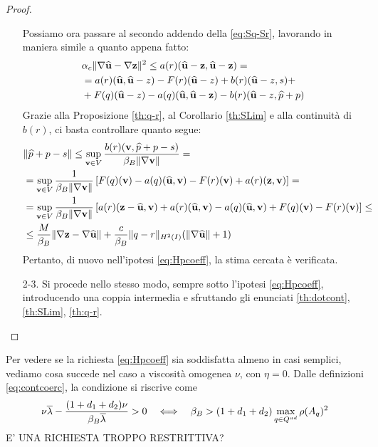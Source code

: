 \begin{proof}
\begin{enumerate}
	Possiamo ora passare al secondo addendo della \eqref{eq:Sq-Sr}, lavorando in maniera simile a quanto appena fatto:
	\begin{equation*}\begin{split}
	&\alpha_c\|\nabla\widehat{\u}-\nabla\z\|^2\leq a(r)(\widehat{\u}-\z,\widehat{\u}-\z)=\\
	&=a(r)(\widehat{\u},\widehat{\u}-z)-F(r)(\widehat{\u}-z)+b(r)(\widehat{\u}-z,s)+\\
	&+F(q)(\widehat{\u}-z)-a(q)(\widehat{\u},\widehat{\u}-\z)-b(r)(\widehat{\u}-z,\widehat{p}+p)%
	\end{split}\end{equation*}
	Grazie alla Proposizione \ref{th:q-r}, al Corollario \ref{th:SLim} e alla continuità di $b(r)$, ci basta controllare quanto segue:
	\begin{equation*}\begin{split}
	&\|\widehat{p}+p-s\|\leq \sup_{\mathbf{v}\in V}\frac{b(r)(\mathbf{v},\widehat{p}+p-s)}{\beta_B\|\nabla\mathbf{v}\|} =\\
	&=\sup_{\mathbf{v}\in V}\frac{1}{\beta_B\|\nabla\mathbf{v}\|}\left[F(q)(\mathbf{v})-a(q)(\widehat{\mathbf{u}},\mathbf{v})-F(r)(\mathbf{v})+a(r)(\mathbf{z},\mathbf{v})\right]=\\
	&=\sup_{\mathbf{v}\in V}\frac{1}{\beta_B\|\nabla\mathbf{v}\|}\left[a(r)(\mathbf{z}-\widehat{\mathbf{u}},\mathbf{v})+a(r)(\widehat{\mathbf{u}},\mathbf{v})-a(q)(\widehat{\mathbf{u}},\mathbf{v})+F(q)(\mathbf{v})-F(r)(\mathbf{v})\right]\leq\\
	&\leq \frac{M}{\beta_B}\|\nabla\mathbf{z}-\nabla\widehat{\mathbf{u}}\| + \frac{c}{\beta_B}\|q-r\|_{H^2(I)}(\|\nabla\widehat{\mathbf{u}}\|+1)
	\end{split}\end{equation*}
	Pertanto, di nuovo nell'ipotesi \eqref{eq:Hpcoeff}, la stima cercata è verificata.
     \item[2-3.] Si procede nello stesso modo, sempre sotto l'ipotesi \eqref{eq:Hpcoeff}, introducendo una coppia intermedia e sfruttando gli enunciati \ref{th:dotcont}, \ref{th:SLim}, \ref{th:q-r}.
	\end{enumerate}
\end{proof}
\begin{oss}
	Per vedere se la richiesta \eqref{eq:Hpcoeff} sia soddisfatta almeno in casi semplici, vediamo cosa succede nel caso a viscosità omogenea $\nu$, con $\eta=0$. Dalle definizioni \eqref{eq:contcoerc}, la condizione si riscrive come
	$$ \nu\overline{\lambda}-\frac{(1+d_1+d_2)\nu}{\beta_B\overline{\lambda}}>0\quad \Longleftrightarrow \quad \beta_B>(1+d_1+d_2)\max_{q\in Q^{ad}}\rho(A_q)^2$$
	\qquad E' UNA RICHIESTA TROPPO RESTRITTIVA?\\
\end{oss}
